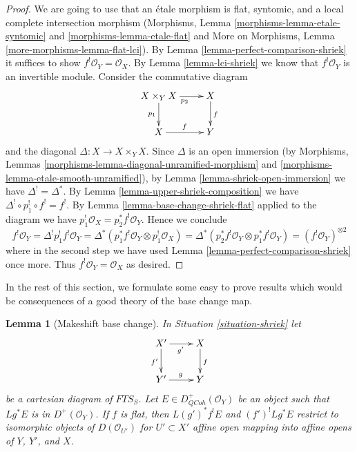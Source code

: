 \documentclass{stacks-project}
\theoremstyle{plain}
\newtheorem{lemma}[subsection]{Lemma}
\theoremstyle{definition}
\theoremstyle{remark}
\numberwithin{equation}{subsection}
\def\QCoh{\mathit{QCoh}}
\begin{document}
\begin{proof}
We are going to use that an \'etale morphism is flat, syntomic,
and a local complete intersection morphism
(Morphisms, Lemma \ref{morphisms-lemma-etale-syntomic} and
\ref{morphisms-lemma-etale-flat} and
More on Morphisms, Lemma \ref{more-morphisms-lemma-flat-lci}).
By Lemma \ref{lemma-perfect-comparison-shriek} it suffices
to show $f^!\mathcal{O}_Y = \mathcal{O}_X$.
By Lemma \ref{lemma-lci-shriek} we know that $f^!\mathcal{O}_Y$
is an invertible module. Consider the commutative diagram
$$
\xymatrix{
X \times_Y X \ar[r]_{p_2} \ar[d]_{p_1} & X \ar[d]^f \\
X \ar[r]^f & Y
}
$$
and the diagonal $\Delta : X \to X \times_Y X$. Since $\Delta$
is an open immersion (by Morphisms, Lemmas
\ref{morphisms-lemma-diagonal-unramified-morphism} and
\ref{morphisms-lemma-etale-smooth-unramified}), by
Lemma \ref{lemma-shriek-open-immersion} we have $\Delta^! = \Delta^*$.
By Lemma \ref{lemma-upper-shriek-composition} we have
$\Delta^! \circ p_1^! \circ f^! = f^!$.
By Lemma \ref{lemma-base-change-shriek-flat} applied to
the diagram we have $p_1^!\mathcal{O}_X = p_2^*f^!\mathcal{O}_Y$.
Hence we conclude
$$
f^!\mathcal{O}_Y = \Delta^!p_1^!f^!\mathcal{O}_Y =
\Delta^*(p_1^*f^!\mathcal{O}_Y \otimes p_1^!\mathcal{O}_X) =
\Delta^*(p_2^*f^!\mathcal{O}_Y \otimes p_1^*f^!\mathcal{O}_Y) =
(f^!\mathcal{O}_Y)^{\otimes 2}
$$
where in the second step we have used
Lemma \ref{lemma-perfect-comparison-shriek} once more.
Thus $f^!\mathcal{O}_Y = \mathcal{O}_X$ as desired.
\end{proof}


\noindent
In the rest of this section, we formulate some easy to prove
results which would be consequences of a good theory of the
base change map.

\begin{lemma}[Makeshift base change]
\label{lemma-base-change-locally}
In Situation \ref{situation-shriek} let
$$
\xymatrix{
X' \ar[r]_{g'} \ar[d]_{f'} & X \ar[d]^f \\
Y' \ar[r]^g & Y
}
$$
be a cartesian diagram of $\textit{FTS}_S$.
Let $E \in D^+_\QCoh(\mathcal{O}_Y)$ be an object
such that $Lg^*E$ is in $D^+(\mathcal{O}_Y)$.
If $f$ is flat, then $L(g')^*f^!E$ and $(f')^!Lg^*E$
restrict to isomorphic objects of $D(\mathcal{O}_{U'})$
for $U' \subset X'$ affine open mapping into affine opens of $Y$, $Y'$, and $X$.
\end{lemma}
\end{document}

